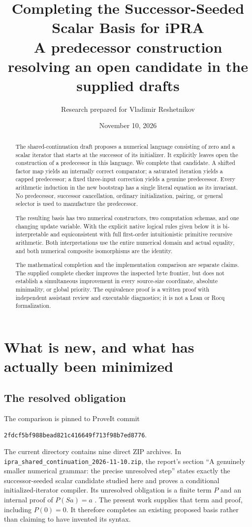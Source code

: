 \documentclass[11pt,letterpaper]{article}
\title{\textbf{Completing the Successor-Seeded\\Scalar Basis for iPRA}\\[.5em]
\large A predecessor construction resolving an open candidate in the supplied drafts}
\author{Research prepared for Vladimir Reshetnikov}
\date{November 10, 2026}
\theoremstyle{definition}\newtheorem{definition}[theorem]{Definition}
\theoremstyle{remark}\newtheorem{remark}[theorem]{Remark}
\newcommand{\file}[1]{{\small\nolinkurl{#1}}}
\begin{document}
\maketitle
\begin{abstract}
The shared-continuation draft proposes a numerical language consisting of
zero and a scalar iterator that starts at the successor of its initializer.
It explicitly leaves open the construction of a predecessor in this
language. We complete that candidate. A shifted factor map yields an
internally correct comparator; a saturated iteration yields a capped
predecessor; a fixed three-input correction yields a genuine predecessor.
Every arithmetic induction in the new bootstrap has a single literal
equation as its invariant. No predecessor, successor cancellation, ordinary
initialization, pairing, or general selector is used to manufacture the
predecessor.

The resulting basis has two numerical constructors, two computation
schemas, and one changing update variable. With the explicit native
logical rules given below it is bi-interpretable and equiconsistent with
full first-order intuitionistic primitive recursive arithmetic. Both
interpretations use the entire numerical domain and actual equality, and
both numerical composite isomorphisms are the identity.

The mathematical completion and the implementation comparison are separate
claims. The supplied complete checker improves the inspected byte frontier,
but does not establish a simultaneous improvement in every source-size
coordinate, absolute minimality, or global priority. The equivalence proof
is a written proof with independent assistant review and executable
diagnostics; it is not a Lean or Rocq formalization.
\end{abstract}
\clearpage
\begingroup
\small\setlength{\parskip}{0pt}
\setcounter{tocdepth}{2}\tableofcontents
\endgroup
\clearpage

\section{What is new, and what has actually been minimized}
\label{sec:result}

\subsection{The resolved obligation}
The comparison is pinned to ProveIt commit
\begin{center}\file{2fdcf5bf988bead821c416649f713f98b7ed8776}.\end{center}
The current directory contains nine direct ZIP archives. In
\file{ipra_shared_continuation_2026-11-10.zip}, the report's section
``A genuinely smaller numerical grammar: the precise unresolved step''
states exactly the successor-seeded scalar candidate studied here and
proves a conditional initialized-iterator compiler. Its unresolved
obligation is a finite term $P$ and an internal proof of $P(Sa)=a$
\cite{shared}. The present work supplies that term and proof, including
$P(0)=0$. It therefore completes an existing proposed basis rather than
claiming to have invented its syntax.
\end{document}
